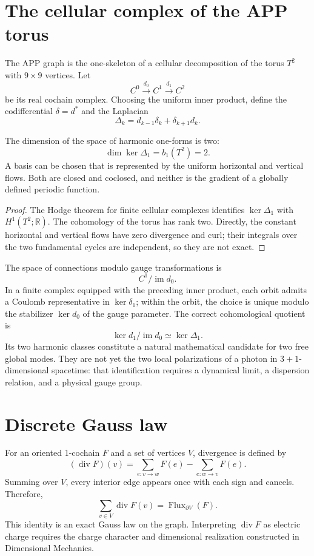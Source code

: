 \section{The cellular complex of the APP torus}

The APP graph is the one-skeleton of a cellular decomposition of the torus
\(T^2\) with \(9\times9\) vertices. Let
\[
 C^0\xrightarrow{d_0}C^1\xrightarrow{d_1}C^2
\]
be its real cochain complex. Choosing the uniform inner product,
define the codifferential \(\delta=d^*\) and the Laplacian
\[
 \Delta_k=d_{k-1}\delta_k+\delta_{k+1}d_k.
\]

\begin{theorem}
The dimension of the space of harmonic one-forms is two:
\[
 \dim\ker\Delta_1=b_1(T^2)=2.
\]
A basis can be chosen that is represented by the uniform horizontal and
vertical flows. Both are closed and coclosed, and neither is the gradient of
a globally defined periodic function.
\end{theorem}

\begin{proof}
The Hodge theorem for finite cellular complexes identifies
\(\ker\Delta_1\) with \(H^1(T^2;\mathbb R)\). The cohomology of the torus has
rank two. Directly, the constant horizontal and vertical flows have
zero divergence and curl; their integrals over the two fundamental
cycles are independent, so they are not exact.
\end{proof}

The space of connections modulo gauge transformations is
\[
 C^1/\operatorname{im}d_0.
\]
In a finite complex equipped with the preceding inner product, each orbit
admits a Coulomb representative in \(\ker\delta_1\); within the orbit,
the choice is unique modulo the stabilizer \(\ker d_0\) of the gauge
parameter. The correct cohomological quotient is
\[
 \ker d_1/\operatorname{im}d_0
 \simeq \ker\Delta_1 .
\]
Its two harmonic classes constitute a natural mathematical candidate for
two free global modes. They are not yet the two local polarizations of
a photon in \(3+1\)-dimensional spacetime: that identification requires a
dynamical limit, a dispersion relation, and a physical gauge group.

\section{Discrete Gauss law}

For an oriented 1-cochain \(F\) and a set of vertices \(V\),
divergence is defined by
\[
 (\operatorname{div}F)(v)=
 \sum_{e:v\to w}F(e)-\sum_{e:w\to v}F(e).
\]
Summing over \(V\), every interior edge appears once with each sign and
cancels. Therefore,
\[
 \boxed{
 \sum_{v\in V}\operatorname{div}F(v)
 =\operatorname{Flux}_{\partial V}(F).}
\]
This identity is an exact Gauss law on the graph. Interpreting
\(\operatorname{div}F\) as electric charge requires the charge character and
dimensional realization constructed in Dimensional Mechanics.

